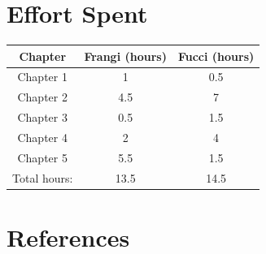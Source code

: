 \documentclass[12pt,a4paper]{report}
\begin{document}
			

	\chapter{Effort Spent}
		\begin{table}[H]
			\centering
			\begin{tabular}[width = \textwidth]{|c|c|c|}
				\hline
				Chapter & Frangi (hours) & Fucci (hours)\\
				\hline
				\hline
				Chapter 1 & 1 & 0.5\\
				
				Chapter 2 & 4.5 & 7\\
				
				Chapter 3 & 0.5 & 1.5\\
				
				Chapter 4 & 2 & 4\\
				
				Chapter 5 & 5.5 & 1.5\\
				
				Total hours: & 13.5 & 14.5\\
				\hline
			\end{tabular}
			\label{tab: }
		\end{table}
	\chapter{References}
\end{document}
